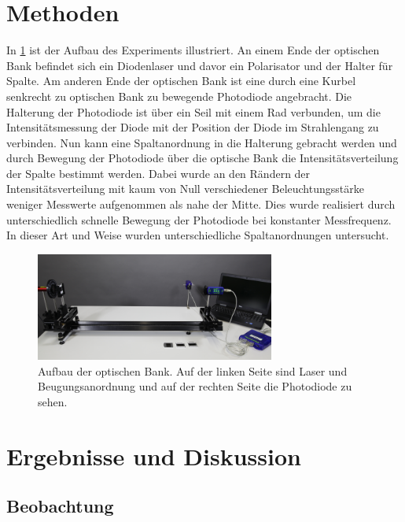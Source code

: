\documentclass[
	a4paper,
	12pt,
	pagesize,
	ngerman
]{scrartcl}
\begin{document}
	\section{Methoden}
	In \cref{optischeBank} ist der Aufbau des Experiments illustriert.
	An einem Ende der optischen Bank befindet sich ein Diodenlaser und davor ein Polarisator und der Halter für Spalte.
	Am anderen Ende der optischen Bank ist eine durch eine Kurbel senkrecht zu optischen Bank zu bewegende Photodiode angebracht.
	Die Halterung der Photodiode ist über ein Seil mit einem Rad verbunden, um die Intensitätsmessung der Diode mit der Position der Diode im Strahlengang zu verbinden.
	Nun kann eine Spaltanordnung in die Halterung gebracht werden und durch Bewegung der Photodiode über die optische Bank die Intensitätsverteilung der Spalte bestimmt werden.
	Dabei wurde an den Rändern der Intensitätsverteilung mit kaum von Null verschiedener Beleuchtungsstärke weniger Messwerte aufgenommen als nahe der Mitte.
	Dies wurde realisiert durch unterschiedlich schnelle Bewegung der Photodiode bei konstanter Messfrequenz.
	In dieser Art und Weise wurden unterschiedliche Spaltanordnungen untersucht. 
	
	\begin{figure}[H]
		\includegraphics[width=0.7\textwidth]{optischeBank}
		\centering
		\caption{Aufbau der optischen Bank. Auf der linken Seite sind Laser und Beugungsanordnung und auf der rechten Seite die Photodiode zu sehen.\cite{optischeBank} }
		\label{optischeBank}
		\centering
	\end{figure} 
	
	\section{Ergebnisse und Diskussion}
	

	\subsection{Beobachtung}
	
\end{document}
